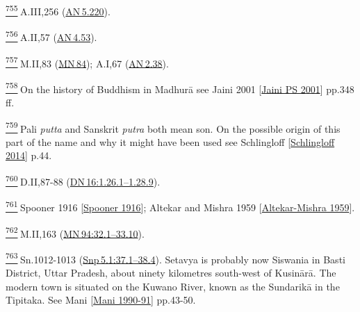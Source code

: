 \label{footprints_split_025.html_fn755}
\hyperref[footprints_split_019.htmlux5cux23fnref755]{\textsuperscript{755}} A.III,256
(\href{https://suttacentral.net/an5.220/en/sujato}{AN\,5.220}).

\label{footprints_split_025.html_fn756}
\hyperref[footprints_split_019.htmlux5cux23fnref756]{\textsuperscript{756}} A.II,57
(\href{https://suttacentral.net/an4.53/en/sujato}{AN\,4.53}).

\label{footprints_split_025.html_fn757}
\hyperref[footprints_split_019.htmlux5cux23fnref757]{\textsuperscript{757}} M.II,83
(\href{https://suttacentral.net/mn84/en/sujato}{MN\,84}); A.I,67
(\href{https://suttacentral.net/an2.38/en/sujato}{AN\,2.38}).

\label{footprints_split_025.html_fn758}
\hyperref[footprints_split_019.htmlux5cux23fnref758]{\textsuperscript{758}} On
the history of Buddhism in Madhurā see {Jaini 2001
{{[}\hyperref[footprints_split_022.htmlux5cux23Jainiux5cux2520PSux5cux25202001]{Jaini
PS 2001}{]}}} pp.348 ff.

\label{footprints_split_025.html_fn759}
\hyperref[footprints_split_019.htmlux5cux23fnref759]{\textsuperscript{759}} Pali
\emph{putta} and Sanskrit \emph{putra} both mean son. On the possible
origin of this part of the name and why it might have been used see
{Schlingloff
{{[}\hyperref[footprints_split_022.htmlux5cux23Schlingloffux5cux25202014]{Schlingloff
2014}{]}}} p.44.

\label{footprints_split_025.html_fn760}
\hyperref[footprints_split_019.htmlux5cux23fnref760]{\textsuperscript{760}} D.II,87-88
(\href{https://suttacentral.net/dn16/en/sujato\#1.26.1}{DN\,16:1.26.1--1.28.9}).

\label{footprints_split_025.html_fn761}
\hyperref[footprints_split_019.htmlux5cux23fnref761]{\textsuperscript{761}} {Spooner
1916
{{[}\hyperref[footprints_split_023.htmlux5cux23Spoonerux5cux25201916]{Spooner
1916}{]}}}; {Altekar and Mishra 1959
{{[}\hyperref[footprints_split_023.htmlux5cux23Altekar-Mishraux5cux25201959]{Altekar-Mishra
1959}{]}}}.

\label{footprints_split_025.html_fn762}
\hyperref[footprints_split_019.htmlux5cux23fnref762]{\textsuperscript{762}} M.II,163
(\href{https://suttacentral.net/mn94/en/sujato\#32.1}{MN\,94:32.1--33.10}).

\label{footprints_split_025.html_fn763}
\hyperref[footprints_split_019.htmlux5cux23fnref763]{\textsuperscript{763}} Sn.1012-1013
(\href{https://suttacentral.net/snp5.1/en/sujato\#37.1}{Snp\,5.1:37.1--38.4}).
Setavya is probably now Siswania in Basti District, Uttar Pradesh, about
ninety kilometres south-west of Kusinārā. The modern town is situated on
the Kuwano River, known as the Sundarikā in the Tipitaka. See {Mani
{{[}\hyperref[footprints_split_022.htmlux5cux23Maniux5cux25201990-91]{Mani
1990-91}{]}}} pp.43-50.


